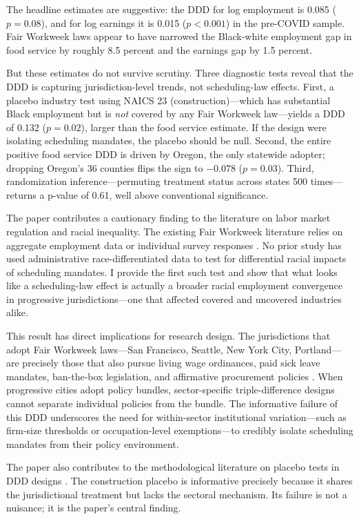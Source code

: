 \documentclass[12pt]{article}
\begin{document}
The headline estimates are suggestive: the DDD for log employment is 0.085 ($p = 0.08$), and for log earnings it is 0.015 ($p < 0.001$) in the pre-COVID sample. Fair Workweek laws appear to have narrowed the Black-white employment gap in food service by roughly 8.5 percent and the earnings gap by 1.5 percent.

But these estimates do not survive scrutiny. Three diagnostic tests reveal that the DDD is capturing jurisdiction-level trends, not scheduling-law effects. First, a placebo industry test using NAICS 23 (construction)---which has substantial Black employment but is \textit{not} covered by any Fair Workweek law---yields a DDD of 0.132 ($p = 0.02$), larger than the food service estimate. If the design were isolating scheduling mandates, the placebo should be null. Second, the entire positive food service DDD is driven by Oregon, the only statewide adopter; dropping Oregon's 36 counties flips the sign to $-0.078$ ($p = 0.03$). Third, randomization inference---permuting treatment status across states 500 times---returns a p-value of 0.61, well above conventional significance.

The paper contributes a cautionary finding to the literature on labor market regulation and racial inequality. The existing Fair Workweek literature relies on aggregate employment data \citep{harknett2019} or individual survey responses \citep{storer2022}. No prior study has used administrative race-differentiated data to test for differential racial impacts of scheduling mandates. I provide the first such test and show that what looks like a scheduling-law effect is actually a broader racial employment convergence in progressive jurisdictions---one that affected covered and uncovered industries alike.

This result has direct implications for research design. The jurisdictions that adopt Fair Workweek laws---San Francisco, Seattle, New York City, Portland---are precisely those that also pursue living wage ordinances, paid sick leave mandates, ban-the-box legislation, and affirmative procurement policies \citep{dube2019}. When progressive cities adopt policy bundles, sector-specific triple-difference designs cannot separate individual policies from the bundle. The informative failure of this DDD underscores the need for within-sector institutional variation---such as firm-size thresholds or occupation-level exemptions---to credibly isolate scheduling mandates from their policy environment.

The paper also contributes to the methodological literature on placebo tests in DDD designs \citep{gruber1994, olden2022}. The construction placebo is informative precisely because it shares the jurisdictional treatment but lacks the sectoral mechanism. Its failure is not a nuisance; it is the paper's central finding.
\end{document}
